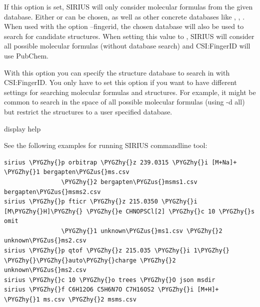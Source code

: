 \documentclass[letterpaper,10pt,openany,oneside]{sphinxmanual}
\def\PYGZus{\char`\_}
\def\PYGZhy{\char`\-}
\begin{document}

\begin{fulllineitems}
\label{commandline:cmdoption--database}
If this option is set, SIRIUS will only consider molecular formulas from the given database. Either  or  can be chosen, as well as other concrete databases like , , . When used with the option --fingerid, the chosen database will also be used to search for candidate structures. When setting this value to , SIRIUS will consider all possible molecular formulas (without database search) and CSI:FingerID will use PubChem.

\end{fulllineitems}


\begin{fulllineitems}
\label{commandline:cmdoption--fingerid-db}
With this option you can specify the structure database to search in with CSI:FingerID. You only have to set this option if you want to have different settings for searching molecular formulas and structures. For example, it might be common to search in the space of all possible molecular formulas (using -d all) but restrict the structures to a user specified database. 

\end{fulllineitems}


\begin{fulllineitems}
\label{commandline:cmdoption-h}
display help

\end{fulllineitems}


See the following examples for running SIRIUS commandline tool:

\begin{Verbatim}[commandchars=\\\{\}]
sirius \PYGZhy{}p orbitrap \PYGZhy{}z 239.0315 \PYGZhy{}i [M+Na]+ \PYGZhy{}1 bergapten\PYGZus{}ms.csv
                \PYGZhy{}2 bergapten\PYGZus{}msms1.csv bergapten\PYGZus{}msms2.csv
sirius \PYGZhy{}p fticr \PYGZhy{}z 215.0350 \PYGZhy{}i [M\PYGZhy{}H]\PYGZhy{} \PYGZhy{}e CHNOPSCl[2] \PYGZhy{}c 10 \PYGZhy{}s omit
                \PYGZhy{}1 unknown\PYGZus{}ms1.csv \PYGZhy{}2 unknown\PYGZus{}ms2.csv
sirius \PYGZhy{}p qtof \PYGZhy{}z 215.035 \PYGZhy{}i 1\PYGZhy{} \PYGZhy{}\PYGZhy{}auto\PYGZhy{}charge \PYGZhy{}2 unknown\PYGZus{}ms2.csv
sirius \PYGZhy{}c 10 \PYGZhy{}o trees \PYGZhy{}O json msdir
sirius \PYGZhy{}f C6H12O6 C5H6N7O C7H16OS2 \PYGZhy{}i [M+H]+ \PYGZhy{}1 ms.csv \PYGZhy{}2 msms.csv
\end{Verbatim}
\end{document}
